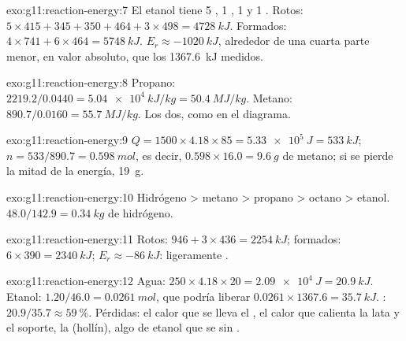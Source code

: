 \begin{solution}{exo:g11:reaction-energy:7}
El etanol  tiene 5 , 1 , 1  y 1
. Rotos: $5 \times 415 + 345 + 350 + 464 + 3 \times 498 =
\qty{4728}{kJ}$. Formados: $4 \times 741 + 6 \times 464 = \qty{5748}{kJ}$.
$E_r \approx \qty{-1020}{kJ}$, alrededor de una cuarta parte menor, en
valor absoluto, que los \qty{1367.6}{kJ} medidos.
\end{solution}

\begin{solution}{exo:g11:reaction-energy:8}
Propano: $2219.2 / 0.0440 = \qty{5.04e4}{kJ/kg} = \qty{50.4}{MJ/kg}$.
Metano: $890.7 / 0.0160 = \qty{55.7}{MJ/kg}$. Los dos, como en el
diagrama.
\end{solution}

\begin{solution}{exo:g11:reaction-energy:9}
$Q = 1500 \times 4.18 \times 85 = \qty{5.33e5}{J} = \qty{533}{kJ}$;
$n = 533 / 890.7 = \qty{0.598}{mol}$, es decir, $0.598 \times 16.0 =
\qty{9.6}{g}$ de metano; si se pierde la mitad de la energía,
\qty{19}{g}.
\end{solution}

\begin{solution}{exo:g11:reaction-energy:10}
Hidrógeno > metano > propano > octano > etanol.
$48.0 / 142.9 = \qty{0.34}{kg}$ de hidrógeno.
\end{solution}

\begin{solution}{exo:g11:reaction-energy:11}
Rotos: $946 + 3 \times 436 = \qty{2254}{kJ}$; formados:
$6 \times 390 = \qty{2340}{kJ}$; $E_r \approx \qty{-86}{kJ}$: ligeramente
.
\end{solution}

\begin{solution}{exo:g11:reaction-energy:12}
Agua: $250 \times 4.18 \times 20 = \qty{2.09e4}{J} = \qty{20.9}{kJ}$.
Etanol: $1.20 / 46.0 = \qty{0.0261}{mol}$, que podría liberar
$0.0261 \times 1367.6 = \qty{35.7}{kJ}$. :
$20.9 / 35.7 \approx \qty{59}{\percent}$. Pérdidas: el calor que se lleva
el , el calor que calienta la lata y el soporte, la  (hollín), algo de etanol que se  sin .
\end{solution}

